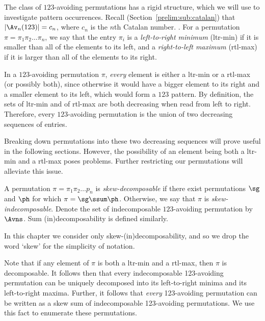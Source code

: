 \documentclass[12pt,twoside]{memoir}
\begin{document}
      The class of $123$-avoiding permutations has a rigid structure, which we will
      use to investigate pattern occurrences. 
      Recall (Section~\ref{prelim:sub:catalan}) that $|\Av_n(123)| = c_n$, where $c_n$
      is the $n$th Catalan number.  .  For a permutation
      $\pi = \pi_1 \pi_2 \dots \pi_n$, we say that the entry $\pi_i$ is a
      \emph{left-to-right minimum} (ltr-min)  if it
      is smaller than all of the elements to its left, and a \emph{right-to-left
      maximum} (rtl-max)  if it is larger than all of
      the elements to its right. 
      
      In a $123$-avoiding permutation $\pi$, \emph{every} element is either a
      ltr-min or a rtl-max (or possibly both), since otherwise it would have a bigger
      element to its right and a smaller element to its left, which would form a
      $123$ pattern. By definition, the sets of ltr-min and of rtl-max are both
      decreasing when read from left to right. Therefore, every $123$-avoiding
      permutation is the union of two decreasing sequences of entries. 

      Breaking down permutations into these two decreasing sequences will prove
      useful in the following sections. However, the possibility of an element
      being both a ltr-min and a rtl-max poses problems. Further restricting our
      permutations will alleviate this issue. 

      \begin{definition} \label{def:indecomposable}
        A permutation $\pi = \pi_1 \pi_2 \dots p_n$ is \emph{skew-decomposable}  if
        there exist permutations $\sg$ and $\ph$ for which $\pi = \sg \ssum \ph$.
        Otherwise, we say that $\pi$ is \emph{skew-indecomposable}.  Denote the set of
        indecomposable $123$-avoiding permutation by $\Avns$. 
        Sum (in)decomposability is defined similarly. 
      \end{definition}
      
      In this chapter we consider only
      skew-(in)decomposability, and so we drop the word `skew' for the simplicity
      of notation. 


      Note that if any element of $\pi$ is both a ltr-min and a rtl-max, then $\pi$
      is decomposable. It follows then that every indecomposable 123-avoiding
      permutation can be uniquely decomposed into its left-to-right minima and its
      left-to-right maxima. Further, it follows that \emph{every} 123-avoiding
      permutation can be written as a skew sum of indecomposable 123-avoiding
      permutations. We use this fact to enumerate these permutations.
\end{document}
